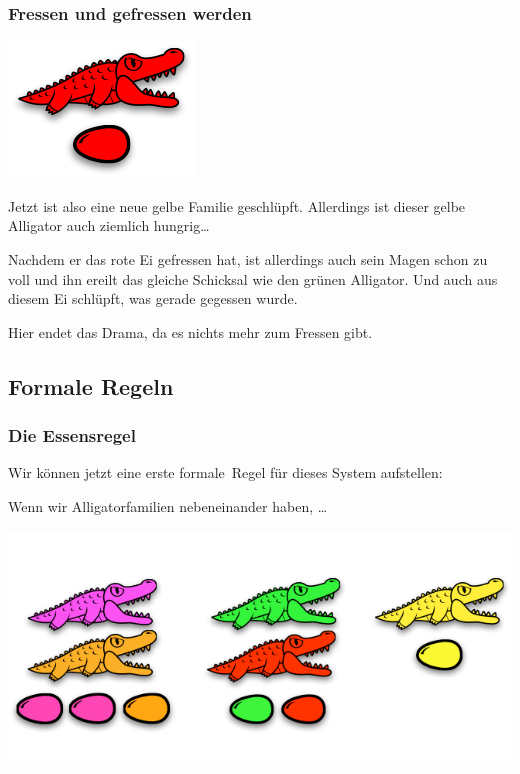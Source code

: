 \documentclass{beamer}
\begin{document}

\begin{frame}
\begin{multicols}{2}
\frametitle{Fressen und gefressen werden}

\begin{center}
\includegraphics[scale=0.45]{eating_10.png} 
\end{center}
\columnbreak

Jetzt ist also eine neue gelbe Familie geschlüpft. Allerdings ist dieser gelbe Alligator auch ziemlich hungrig\dots

Nachdem er das rote Ei gefressen hat, ist allerdings auch sein Magen schon zu voll und ihn ereilt das gleiche Schicksal wie den grünen Alligator. Und auch aus diesem Ei schlüpft, was gerade gegessen wurde.

Hier endet das Drama, da es nichts mehr zum Fressen gibt.

\end{multicols}
\end{frame}

\subsection*{Formale Regeln}

\begin{frame}
\frametitle{Die Essensregel}

Wir können jetzt eine erste \glqq formale\grqq\ Regel für dieses System aufstellen:\bigskip\pause

Wenn wir Alligatorfamilien nebeneinander haben, \dots\bigskip

\begin{center}
\includegraphics[scale=0.35]{eatingrule_1.png} 
\end{center}

\end{frame}
\end{document}
